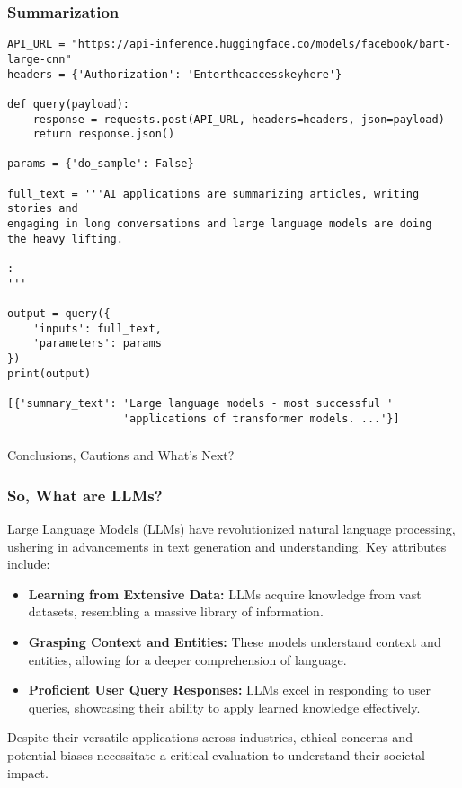 \begin{frame}[fragile]\frametitle{Summarization}


\begin{lstlisting}
API_URL = "https://api-inference.huggingface.co/models/facebook/bart-large-cnn"
headers = {'Authorization': 'Entertheaccesskeyhere'}

def query(payload):
    response = requests.post(API_URL, headers=headers, json=payload)
    return response.json()
    
params = {'do_sample': False}

full_text = '''AI applications are summarizing articles, writing stories and 
engaging in long conversations and large language models are doing 
the heavy lifting.

:
'''

output = query({
    'inputs': full_text,
    'parameters': params
})
print(output)

[{'summary_text': 'Large language models - most successful '
                  'applications of transformer models. ...'}]
\end{lstlisting}


\end{frame}

\begin{frame}[fragile]\frametitle{}
\begin{center}
{\Large Conclusions, Cautions and What's Next?}
\end{center}
\end{frame}


\begin{frame}[fragile]\frametitle{So, What are LLMs?}

  Large Language Models (LLMs) have revolutionized natural language processing, ushering in advancements in text generation and understanding. Key attributes include:

  \begin{itemize}
    \item \textbf{Learning from Extensive Data:} LLMs acquire knowledge from vast datasets, resembling a massive library of information.

    \item \textbf{Grasping Context and Entities:} These models understand context and entities, allowing for a deeper comprehension of language.

    \item \textbf{Proficient User Query Responses:} LLMs excel in responding to user queries, showcasing their ability to apply learned knowledge effectively.

  \end{itemize}

  Despite their versatile applications across industries, ethical concerns and potential biases necessitate a critical evaluation to understand their societal impact.

\end{frame}

